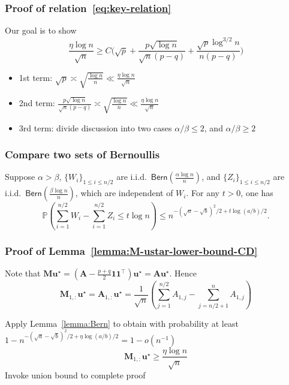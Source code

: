 \documentclass[compress,
mathserif,wide,%
]{beamer}
\begin{document}
\begin{frame}
	\frametitle{Proof of relation~\eqref{eq:key-relation}}
	Our goal is to show 
	\[
	\frac{\eta \log n}{\sqrt{n}} \geq C \Big( \sqrt{p}+\frac{p\sqrt{\log n}}{\sqrt{n}(p-q)}+\frac{\sqrt{p}\log^{3/2}n}{n(p-q)} \Big)
	\]
	
	\vfill
	\begin{itemize}
		\item 1st term: $\sqrt{p} \asymp \sqrt{\frac{\log n}{n}} \ll \frac{\eta \log n}{\sqrt{n}}$
		\item 2nd term: $\frac{p\sqrt{\log n}}{\sqrt{n}(p-q)} \asymp \sqrt{\frac{\log n}{n}} \ll \frac{\eta \log n}{\sqrt{n}}$
		\item 3rd term: divide discussion into two cases $\alpha / \beta \leq 2$, and $\alpha / \beta \geq 2$

	\end{itemize}
\end{frame}

\begin{frame}
	\frametitle{Compare two sets of Bernoullis}
	\begin{lemma}\label{lemma:Bern}
	Suppose $\alpha>\beta$, $\{W_{i}\}_{1\leq i\leq n/2}$ are i.i.d.~$\mathsf{Bern}(\frac{\alpha\log n}{n})$,
and $\{Z_{i}\}_{1\leq i\leq n/2}$ are i.i.d.~$\mathsf{Bern}(\frac{\beta\log n}{n})$,
which are independent of $W_{i}$. For any $t>0$, one has
\[
\mathbb{P}\left(\sum_{i=1}^{n/2}W_{i}-\sum_{i=1}^{n/2}Z_{i}\leq t\log n\right)\leq n^{-(\sqrt{a}-\sqrt{b})^{2}/2+t\log(a/b)/2}.
\]
	\end{lemma}
\end{frame}

\begin{frame}
	\frametitle{Proof of Lemma~\ref{lemma:M-ustar-lower-bound-CD}}
	Note that $\bm{M}\bm{u}^{\star} = (\bm{A} - \frac{p+q}{2}\bm{1}\bm{1}^\top)\bm{u}^{\star} = \bm{A} \bm{u}^\star$. Hence
\[
\bm{M}_{1,:}\bm{u}^{\star}=\bm{A}_{1,:}\bm{u}^{\star}=\frac{1}{\sqrt{n}}\left(\sum_{j=1}^{n/2}A_{1,j}-\sum_{j=n/2+1}^{n}A_{1,j}\right)
\]

\vfill
Apply Lemma~\ref{lemma:Bern} to obtain with probability at least $1- n^{-(\sqrt{a}-\sqrt{b})^{2}/2+\eta\log(a/b)/2} = 1 - o(n^{-1})$
\[
\bm{M}_{1,:}\bm{u}^{\star} \geq \frac{\eta \log n}{\sqrt{n}}
\]
Invoke union bound to complete proof
\end{frame}
\end{document}
